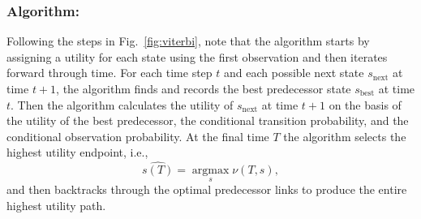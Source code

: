 \documentclass[]{article}
\newcommand{\argmax}{\operatorname*{argmax}}
\newcommand{\ti}[2]{{#1}{(#2)}}                  %
\newcommand{\ie}{i.e.\xspace}
\begin{document}
\subsubsection*{Algorithm:}
Following the steps in Fig.~\ref{fig:viterbi}, note that the algorithm
starts by assigning a utility for each state using the first
observation and then iterates forward through time.  For each time
step $t$ and each possible next state $s_\text{next}$ at time $t+1$,
the algorithm finds and records the best predecessor state $s_\text{best}$
at time $t$.  Then the algorithm calculates the utility of
$s_\text{next}$ at time $t+1$ on the basis of the utility of the best
predecessor, the conditional transition probability, and the
conditional observation probability.  At the final time $T$ the
algorithm selects the highest utility endpoint, \ie,
\begin{equation*}
  \hat {\ti{s}{T}} = \argmax_s \nu(T,s),
\end{equation*}
and then backtracks through the optimal predecessor links to produce
the entire highest utility path.
\end{document}
